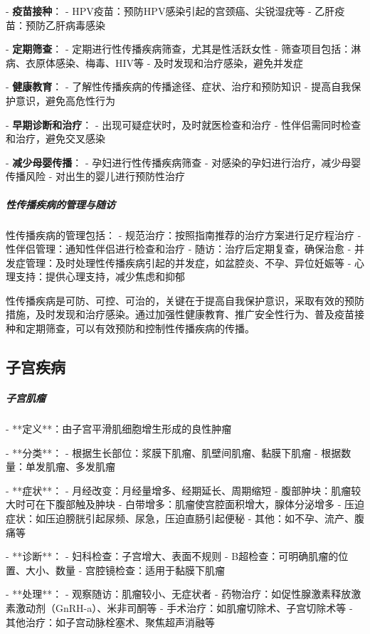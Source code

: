\begin{enumerate}
- \textbf{疫苗接种}：
  - HPV疫苗：预防HPV感染引起的宫颈癌、尖锐湿疣等
  - 乙肝疫苗：预防乙肝病毒感染

- \textbf{定期筛查}：
  - 定期进行性传播疾病筛查，尤其是性活跃女性
  - 筛查项目包括：淋病、衣原体感染、梅毒、HIV等
  - 及时发现和治疗感染，避免并发症

- \textbf{健康教育}：
  - 了解性传播疾病的传播途径、症状、治疗和预防知识
  - 提高自我保护意识，避免高危性行为

- \textbf{早期诊断和治疗}：
  - 出现可疑症状时，及时就医检查和治疗
  - 性伴侣需同时检查和治疗，避免交叉感染

- \textbf{减少母婴传播}：
  - 孕妇进行性传播疾病筛查
  - 对感染的孕妇进行治疗，减少母婴传播风险
  - 对出生的婴儿进行预防性治疗

\subparagraph{性传播疾病的管理与随访}

性传播疾病的管理包括：
- 规范治疗：按照指南推荐的治疗方案进行足疗程治疗
- 性伴侣管理：通知性伴侣进行检查和治疗
- 随访：治疗后定期复查，确保治愈
- 并发症管理：及时处理性传播疾病引起的并发症，如盆腔炎、不孕、异位妊娠等
- 心理支持：提供心理支持，减少焦虑和抑郁

性传播疾病是可防、可控、可治的，关键在于提高自我保护意识，采取有效的预防措施，及时发现和治疗感染。通过加强性健康教育、推广安全性行为、普及疫苗接种和定期筛查，可以有效预防和控制性传播疾病的传播。

\subsection{子宫疾病}

\subparagraph{子宫肌瘤}

- **定义**：由子宫平滑肌细胞增生形成的良性肿瘤

- **分类**：
  - 根据生长部位：浆膜下肌瘤、肌壁间肌瘤、黏膜下肌瘤
  - 根据数量：单发肌瘤、多发肌瘤

- **症状**：
  - 月经改变：月经量增多、经期延长、周期缩短
  - 腹部肿块：肌瘤较大时可在下腹部触及肿块
  - 白带增多：肌瘤使宫腔面积增大，腺体分泌增多
  - 压迫症状：如压迫膀胱引起尿频、尿急，压迫直肠引起便秘
  - 其他：如不孕、流产、腹痛等

- **诊断**：
  - 妇科检查：子宫增大、表面不规则
  - B超检查：可明确肌瘤的位置、大小、数量
  - 宫腔镜检查：适用于黏膜下肌瘤

- **处理**：
  - 观察随访：肌瘤较小、无症状者
  - 药物治疗：如促性腺激素释放激素激动剂（GnRH-a）、米非司酮等
  - 手术治疗：如肌瘤切除术、子宫切除术等
  - 其他治疗：如子宫动脉栓塞术、聚焦超声消融等


\end{enumerate}

